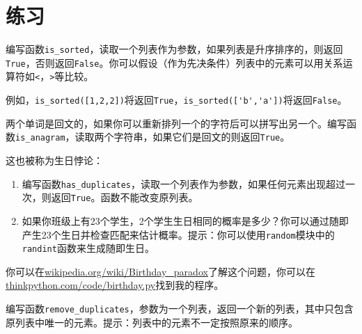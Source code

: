 \section{练习}

\begin{ex}
编写函数\verb"is_sorted"，读取一个列表作为参数，如果列表是升序排序的，则返回{\tt True}，否则返回{\tt False}。你可以假设（作为先决条件）列表中的元素可以用关系运算符如{\tt <}，{\tt >}等比较。


例如，\verb"is_sorted([1,2,2])"将返回{\tt True}，\verb"is_sorted(['b','a'])"将返回{\tt False}。
\end{ex}


\begin{ex}
\label{回文}


两个单词是回文的，如果你可以重新排列一个的字符后可以拼写出另一个。编写函数\verb"is_anagram"，读取两个字符串，如果它们是回文的则返回{\tt True}。
\end{ex}


\begin{ex}
\label{复制}

这也被称为生日悖论：

\begin{enumerate}


\item 编写函数\verb"has_duplicates"，读取一个列表作为参数，如果任何元素出现超过一次，则返回{\tt True}。函数不能改变原列表。

\item 如果你班级上有23个学生，2个学生生日相同的概率是多少？你可以通过随即产生23个生日并检查匹配来估计概率。提示：你可以使用{\tt random}模块中的{\tt randint}函数来生成随即生日。


\end{enumerate}

你可以在\url{wikipedia.org/wiki/Birthday_paradox}了解这个问题，你可以在\url{thinkpython.com/code/birthday.py}找到我的程序。

\end{ex}


\begin{ex}


编写函数\verb"remove_duplicates"，参数为一个列表，返回一个新的列表，其中只包含原列表中唯一的元素。提示：列表中的元素不一定按照原来的顺序。
\end{ex}


